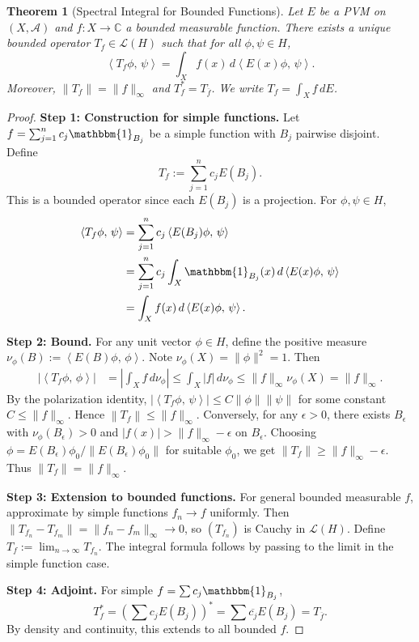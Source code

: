 \documentclass[11pt]{article}
\newtheorem{theorem}{Theorem}[section]
\theoremstyle{definition}
\theoremstyle{remark}
\newcommand{\C}{\mathbb{C}}
\newcommand{\1}{\mathbbm{1}}
\newcommand{\ip}[2]{\left\langle #1,\,#2 \right\rangle}
\newcommand{\norm}[1]{\left\lVert #1 \right\rVert}
\begin{document}
\begin{theorem}[Spectral Integral for Bounded Functions]\label{thm:spectral_integral_bounded}
Let $E$ be a PVM on $(X,\mathcal{A})$ and $f:X\to\C$ a bounded measurable function. There exists a unique bounded operator $T_f\in\mathcal{L}(H)$ such that for all $\phi,\psi\in H$,
\[
\ip{T_f\phi}{\psi}=\int_X f(x)\,d\ip{E(x)\phi}{\psi}.
\]
Moreover, $\norm{T_f}=\|f\|_\infty$ and $T_f^*=T_{\overline{f}}$. We write $T_f=\int_X f\,dE$.
\end{theorem}

\begin{proof}
\textbf{Step 1: Construction for simple functions.}
Let $f=\sum_{j=1}^n c_j\1_{B_j}$ be a simple function with $B_j$ pairwise disjoint. Define
\[
T_f:=\sum_{j=1}^n c_j E(B_j).
\]
This is a bounded operator since each $E(B_j)$ is a projection. For $\phi,\psi\in H$,
\begin{align*}
\ip{T_f\phi}{\psi}&=\sum_{j=1}^n c_j\ip{E(B_j)\phi}{\psi}\\
&=\sum_{j=1}^n c_j\int_X\1_{B_j}(x)\,d\ip{E(x)\phi}{\psi}\\
&=\int_X f(x)\,d\ip{E(x)\phi}{\psi}.
\end{align*}

\textbf{Step 2: Bound.}
For any unit vector $\phi\in H$, define the positive measure $\nu_\phi(B):=\ip{E(B)\phi}{\phi}$. Note $\nu_\phi(X)=\|\phi\|^2=1$. Then
\begin{align*}
|\ip{T_f\phi}{\phi}|&=\left|\int_X f\,d\nu_\phi\right|\leq\int_X|f|\,d\nu_\phi\leq\|f\|_\infty\nu_\phi(X)=\|f\|_\infty.
\end{align*}
By the polarization identity, $|\ip{T_f\phi}{\psi}|\leq C\|\phi\|\|\psi\|$ for some constant $C\leq\|f\|_\infty$. Hence $\norm{T_f}\leq\|f\|_\infty$. Conversely, for any $\epsilon>0$, there exists $B_\epsilon$ with $\nu_\phi(B_\epsilon)>0$ and $|f(x)|>\|f\|_\infty-\epsilon$ on $B_\epsilon$. Choosing $\phi=E(B_\epsilon)\phi_0/\|E(B_\epsilon)\phi_0\|$ for suitable $\phi_0$, we get $\norm{T_f}\geq\|f\|_\infty-\epsilon$. Thus $\norm{T_f}=\|f\|_\infty$.

\textbf{Step 3: Extension to bounded functions.}
For general bounded measurable $f$, approximate by simple functions $f_n\to f$ uniformly. Then $\|T_{f_n}-T_{f_m}\|=\|f_n-f_m\|_\infty\to 0$, so $(T_{f_n})$ is Cauchy in $\mathcal{L}(H)$. Define $T_f:=\lim_{n\to\infty}T_{f_n}$. The integral formula follows by passing to the limit in the simple function case.

\textbf{Step 4: Adjoint.}
For simple $f=\sum c_j\1_{B_j}$,
\[
T_f^*=\left(\sum c_j E(B_j)\right)^*=\sum\overline{c_j}E(B_j)=T_{\overline{f}}.
\]
By density and continuity, this extends to all bounded $f$.
\end{proof}
\end{document}
